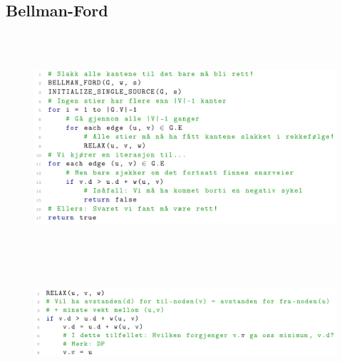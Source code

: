 \documentclass[12pt]{report}
\begin{document}
\vspace{\baselineskip}\subsection*{Bellman-Ford}



\begin{figure}[H]
	\begin{Center}
		\includegraphics[width=6.5in,height=3.31in]{./media/image191.png}
	\end{Center}
\end{figure}



\par


\vspace{\baselineskip}



\begin{figure}[H]
	\begin{Center}
		\includegraphics[width=6.3in,height=1.43in]{./media/image192.png}
	\end{Center}
\end{figure}
\end{document}
